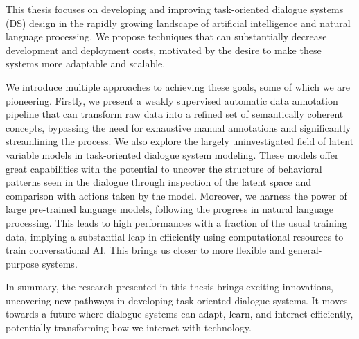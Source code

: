 This thesis focuses on developing and improving task-oriented dialogue systems (DS) design in the rapidly growing landscape of artificial intelligence and natural language processing.
We propose techniques that can substantially decrease development and deployment costs, motivated by the desire to make these systems more adaptable and scalable.

We introduce multiple approaches to achieving these goals, some of which we are pioneering.
Firstly, we present a weakly supervised automatic data annotation pipeline that can transform raw data into a refined set of semantically coherent concepts, bypassing the need for exhaustive manual annotations and significantly streamlining the process.
We also explore the largely uninvestigated field of latent variable models in task-oriented dialogue system modeling.
These models offer great capabilities with the potential to uncover the structure of behavioral patterns seen in the dialogue through inspection of the latent space and comparison with actions taken by the model.
Moreover, we harness the power of large pre-trained language models, following the progress in natural language processing.
This leads to high performances with a fraction of the usual training data, implying a substantial leap in efficiently using computational resources to train conversational AI.
This brings us closer to more flexible and general-purpose systems.

In summary, the research presented in this thesis brings exciting innovations, uncovering new pathways in developing task-oriented dialogue systems.
It moves towards a future where dialogue systems can adapt, learn, and interact efficiently, potentially transforming how we interact with technology.
